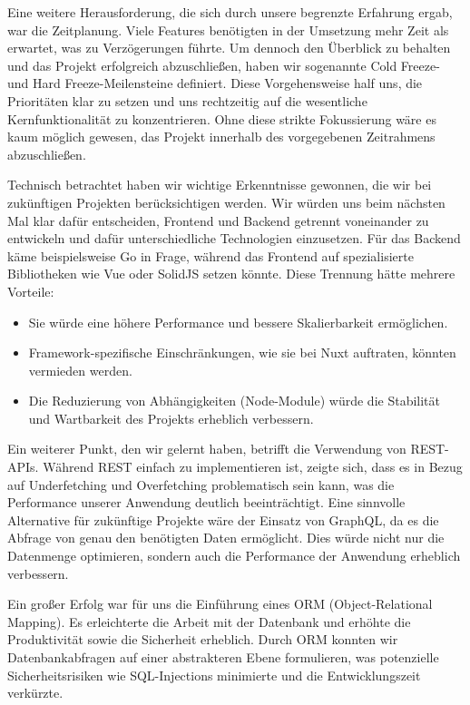 \documentclass[a4paper,12pt]{article}
\begin{document}
Eine weitere Herausforderung, die sich durch unsere begrenzte Erfahrung ergab,
war die Zeitplanung. Viele Features benötigten in der Umsetzung mehr Zeit als
erwartet, was zu Verzögerungen führte. Um dennoch den Überblick zu behalten und
das Projekt erfolgreich abzuschließen, haben wir sogenannte Cold Freeze- und
Hard Freeze-Meilensteine definiert. Diese Vorgehensweise half uns, die
Prioritäten klar zu setzen und uns rechtzeitig auf die wesentliche
Kernfunktionalität zu konzentrieren. Ohne diese strikte Fokussierung wäre es
kaum möglich gewesen, das Projekt innerhalb des vorgegebenen Zeitrahmens
abzuschließen.

Technisch betrachtet haben wir wichtige Erkenntnisse gewonnen, die wir bei
zukünftigen Projekten berücksichtigen werden. Wir würden uns beim nächsten Mal
klar dafür entscheiden, Frontend und Backend getrennt voneinander zu entwickeln
und dafür unterschiedliche Technologien einzusetzen. Für das Backend käme
beispielsweise Go in Frage, während das Frontend auf spezialisierte
Bibliotheken wie Vue oder SolidJS setzen könnte. Diese Trennung hätte mehrere
Vorteile:

\begin{itemize}
    \item Sie würde eine höhere Performance und bessere Skalierbarkeit
        ermöglichen.
    \item Framework-spezifische Einschränkungen, wie sie bei Nuxt auftraten,
        könnten vermieden werden.
    \item Die Reduzierung von Abhängigkeiten (Node-Module) würde die Stabilität
        und Wartbarkeit des Projekts erheblich verbessern.
\end{itemize}

Ein weiterer Punkt, den wir gelernt haben, betrifft die Verwendung von
REST-APIs. Während REST einfach zu implementieren ist, zeigte sich, dass es in
Bezug auf Underfetching und Overfetching problematisch sein kann, was die
Performance unserer Anwendung deutlich beeinträchtigt. Eine sinnvolle
Alternative für zukünftige Projekte wäre der Einsatz von GraphQL, da es die
Abfrage von genau den benötigten Daten ermöglicht. Dies würde nicht nur die
Datenmenge optimieren, sondern auch die Performance der Anwendung erheblich
verbessern.

Ein großer Erfolg war für uns die Einführung eines ORM (Object-Relational
Mapping). Es erleichterte die Arbeit mit der Datenbank und erhöhte die
Produktivität sowie die Sicherheit erheblich. Durch ORM konnten wir
Datenbankabfragen auf einer abstrakteren Ebene formulieren, was potenzielle
Sicherheitsrisiken wie SQL-Injections minimierte und die Entwicklungszeit
verkürzte.
\end{document}
